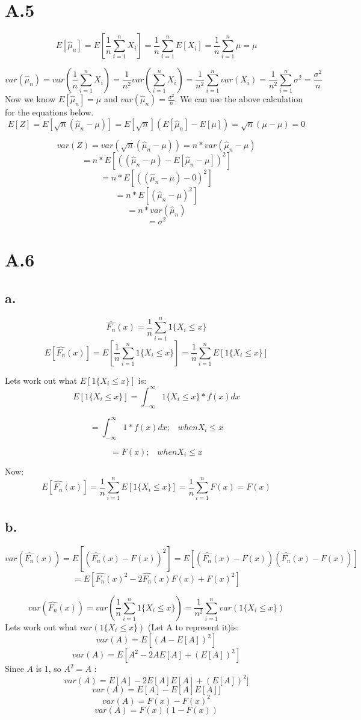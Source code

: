 \documentclass{article}
\begin{document}
\section{A.5}
\[ E[\hat{\mu}_n] = E[\frac{1}{n}\sum_{i=1}^nX_i] = \frac{1}{n}\sum_{i=1}^nE[X_i] = \frac{1}{n}\sum_{i=1}^n\mu = \mu \]

\[ var(\hat{\mu}_n) = var(\frac{1}{n}\sum_{i=1}^n X_i)=\frac{1}{n^2}var(\sum_{i=1}^nX_i)=\frac{1}{n^2}\sum_{i=1}^nvar(X_i)=\frac{1}{n^2}\sum_{i=1}^n\sigma^2=\frac{\sigma^2}{n}\]
Now we know $E[\hat{\mu}_n]=\mu$ and $var(\hat{\mu}_n)=\frac{\sigma^2}{n}$. We can use the above calculation for the equations below.
\[ E[Z] = E[\sqrt{n}(\hat{\mu}_n-\mu)] = E[\sqrt{n}](E[\hat{\mu}_n] - E[\mu]) = \sqrt{n}(\mu - \mu) = 0\]

\[ var(Z)=var(\sqrt{n}(\hat{\mu}_n-\mu)) = n*var(\hat{\mu}_n-\mu)\] \[=n*E[((\hat{\mu}_n-\mu)-E[\hat{\mu}_n-\mu])^2] \]
\[=n*E[((\hat{\mu}_n-\mu)-0)^2] \]
\[=n*E[(\hat{\mu}_n-\mu)^2] \]
\[=n*var(\hat{\mu}_n)\]
\[=\sigma^2\]


\section{A.6}
\subsection{a.}
\[\hat{F_n}(x)= \frac{1}{n}\sum_{i=1}^n1\{X_i\le x\}\]
\[E[\hat{F_n}(x)]= E[\frac{1}{n}\sum_{i=1}^n1\{X_i\le x\}] = \frac{1}{n}\sum_{i=1}^nE[1\{X_i\le x\}] \]

Lets work out what $E[1\{X_i\le x\}]$ is:
\[ E[1\{X_i\le x\}] = \int_{-\infty}^{\infty} 1\{X_i\le x\}*f(x) dx \]

\[ = \int_{-\infty}^{\infty}1*f(x) dx; \;\;\;when X_i\le x\]

\[ = F(x); \;\;\;when X_i\le x \]

Now:
\[ E[\hat{F_n}(x)]= \frac{1}{n}\sum_{i=1}^nE[1\{X_i\le x\}] = \frac{1}{n}\sum_{i=1}^nF(x)=F(x)\]

\subsection{b.}
\[ var(\hat{F_n}(x))=E[(\hat{F_n}(x) -F(x))^2] = E[(\hat{F_n}(x) -F(x))(\hat{F_n}(x) -F(x))] \]
\[ =E[\hat{F_n}(x)^2-2\hat{F_n}(x)F(x)+F(x)^2] \]

\[ var(\hat{F_n}(x))= var(\frac{1}{n}\sum_{i=1}^n1\{X_i\le x\}) = \frac{1}{n^2}\sum_{i=1}^nvar(1\{X_i\le x\}) \]
Lets work out what $var(1\{X_i\le x\})$ (Let A to represent it)is: 
\[ var(A) = E[(A-E[A])^2]\]
\[ var(A) = E[A^2 -2AE[A]+(E[A])^2]\]
Since $A$ is 1, so $A^2=A$ :
\[ var(A) = E[A] -2E[A]E[A]+(E[A])^2] \]
\[ var(A) = E[A] -E[A]E[A]] \]
\[ var(A) = F(x) - F(x)^2 \]
\[ var(A) = F(x)(1-F(x)) \]
\end{document}

